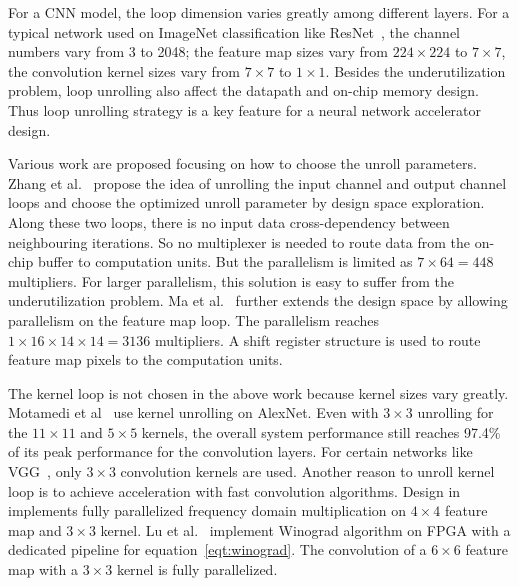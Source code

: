 
For a CNN model, the loop dimension varies greatly among different layers. For a typical network used on ImageNet classification like ResNet~\cite{he2016deep}, the channel numbers vary from 3 to 2048; the feature map sizes vary from $224\times 224$ to $7\times 7$, the convolution kernel sizes vary from $7\times 7$ to $1\times 1$. Besides the underutilization problem, loop unrolling also affect the datapath and on-chip memory design. Thus loop unrolling strategy is a key feature for a neural network accelerator design. 

Various work are proposed focusing on how to choose the unroll parameters. Zhang et al.~\cite{zhang2015optimizing} propose the idea of unrolling the input channel and output channel loops and choose the optimized unroll parameter by design space exploration. Along these two loops, there is no input data cross-dependency between neighbouring iterations. So no multiplexer is needed to route data from the on-chip buffer to computation units. But the parallelism is limited as $7\times 64=448$ multipliers. For larger parallelism, this solution is easy to suffer from the underutilization problem. Ma et al.~\cite{ma2017optimizing} further extends the design space by allowing parallelism on the feature map loop. The parallelism reaches $1\times 16\times 14\times 14=3136$ multipliers. A shift register structure is used to route feature map pixels to the computation units.

The kernel loop is not chosen in the above work because kernel sizes vary greatly. Motamedi et al~\cite{motamedi2016design} use kernel unrolling on AlexNet. Even with $3\times 3$ unrolling for the $11\times 11$ and $5\times 5$ kernels, the overall system performance still reaches 97.4\% of its peak performance for the convolution layers. For certain networks like VGG~\cite{simonyan2014very}, only $3\times 3$ convolution kernels are used. Another reason to unroll kernel loop is to achieve acceleration with fast convolution algorithms. Design in \cite{zhang2017frequency} implements fully parallelized frequency domain multiplication on $4\times 4$ feature map and $3\times 3$ kernel. Lu et al.~\cite{lu2017evaluating} implement Winograd algorithm on FPGA with a dedicated pipeline for equation~\ref{eqt:winograd}. The convolution of a $6\times 6$ feature map with a $3\times 3$ kernel is fully parallelized.

